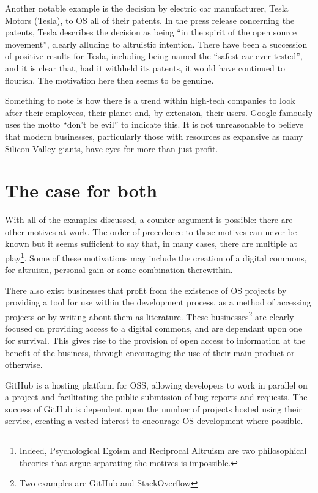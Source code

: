 \documentclass[a4paper]{article}
\begin{document}
Another notable example is the decision by electric car manufacturer, Tesla Motors\cite{tesla} (Tesla), to OS all of their patents\cite{teslapatents}. In the press release concerning the patents, Tesla describes the decision as being “in the spirit of the open source movement”, clearly alluding to altruistic intention. There have been a succession of positive results for Tesla, including being named the “safest car ever tested”\cite{teslasafety}, and it is clear that, had it withheld its patents, it would have continued to flourish. The motivation here then seems to be genuine.

Something to note is how there is a trend within high-tech companies to look after their employees\cite{googlebenefits}, their planet\cite{appleenvironment} and, by extension, their users. Google famously uses the motto “don’t be evil” to indicate this\cite{dontbeevil}. It is not unreasonable to believe that modern businesses, particularly those with resources as expansive as many Silicon Valley giants, have eyes for more than just profit.

\section{The case for both}

With all of the examples discussed, a counter-argument is possible: there are other motives at work. The order of precedence to these motives can never be known but it seems sufficient to say that, in many cases, there are multiple at play\footnote{Indeed, Psychological Egoism and Reciprocal Altruism are two philosophical theories that argue separating the motives is impossible.}. Some of these motivations may include the creation of a digital commons, for altruism, personal gain or some combination therewithin.

There also exist businesses that profit from the existence of OS projects by providing a tool for use within the development process, as a method of accessing projects or by writing about them as literature. These businesses\footnote{Two examples are GitHub\cite{github} and StackOverflow} are clearly focused on providing access to a digital commons, and are dependant upon one for survival. This gives rise to the provision of open access to information at the benefit of the business, through encouraging the use of their main product or otherwise.

GitHub is a hosting platform for OSS, allowing developers to work in parallel on a project and facilitating the public submission of bug reports and requests. The success of GitHub is dependent upon the number of projects hosted using their service, creating a vested interest to encourage OS development where possible. 
\end{document}
